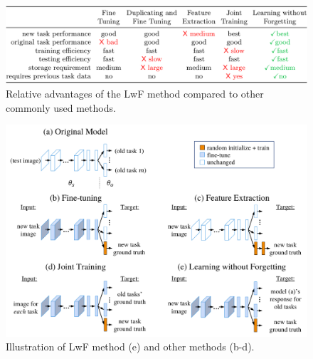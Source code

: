 \documentclass[a4paper,twocolumn]{article}
\begin{document}
\begin{figure}[t]
    \includegraphics[width=\textwidth]{table.png}
    \caption{Relative advantages of the LwF method compared to other commonly used methods.}
    \label{fig:table}
\end{figure}
\begin{figure}[t]
    \includegraphics[width=\textwidth]{methods.png}
    \caption{Illustration of LwF method (e) and other methods (b-d).}
    \label{fig:methods}
\end{figure}
\end{document}
